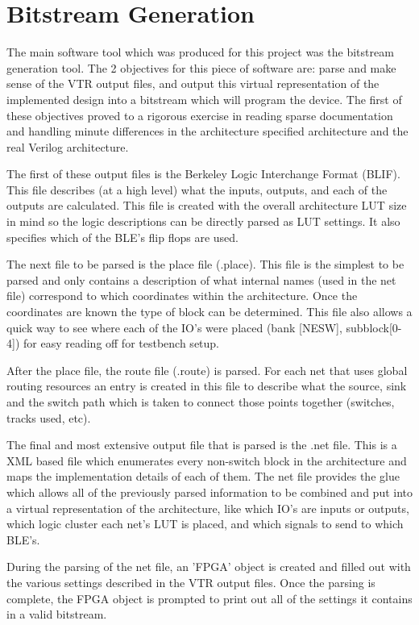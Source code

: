 \documentclass[12pt]{article}
\begin{document}
\newpage
\section{Bitstream Generation}

The main software tool which was produced for this project was the bitstream generation
tool. The 2 objectives for this piece of software are: parse and make sense of the VTR
output files, and output this virtual representation of the implemented design into a
bitstream which will program the device. The first of these objectives proved to a
rigorous exercise in reading sparse documentation and handling minute differences in
the architecture specified architecture and the real Verilog architecture.

The first of these output files is the Berkeley Logic Interchange Format (BLIF).
This file describes (at a high level) what the inputs, outputs, and each of the outputs
are calculated. This
file is created with the overall architecture LUT size in mind so the logic descriptions
can be directly parsed as LUT settings. It also specifies which of the BLE's flip flops are
used.

The next file to be parsed is the place file (.place). This file is the simplest to be
parsed and only contains a description of what internal names (used in the net file)
correspond to which coordinates within the architecture. Once the coordinates are known
the type of block can be determined. This file also allows a quick way to see where each
of the IO's were placed (bank [NESW], subblock[0-4]) for easy reading off for testbench
setup.

After the place file, the route file (.route) is parsed. For each net that uses global
routing resources an entry is created in this file to describe what the source, sink and
the switch path which is taken to connect those points together (switches, tracks used, etc).

The final and most extensive output file that is parsed is the .net file. This is a XML based
file which enumerates
every non-switch block in the architecture and maps the implementation details of each of them.
The net file provides the glue which allows all of the previously parsed information to be
combined and put into a virtual representation of the architecture, like which IO's are
inputs or outputs, which logic cluster each net's LUT is placed, and which signals to send
to which BLE's.

During the parsing of the net file, an 'FPGA' object is created and filled out with
the various settings described in the VTR output files. Once the parsing is complete,
the FPGA object is prompted to print out all of the settings it contains in a valid bitstream.
\end{document}
